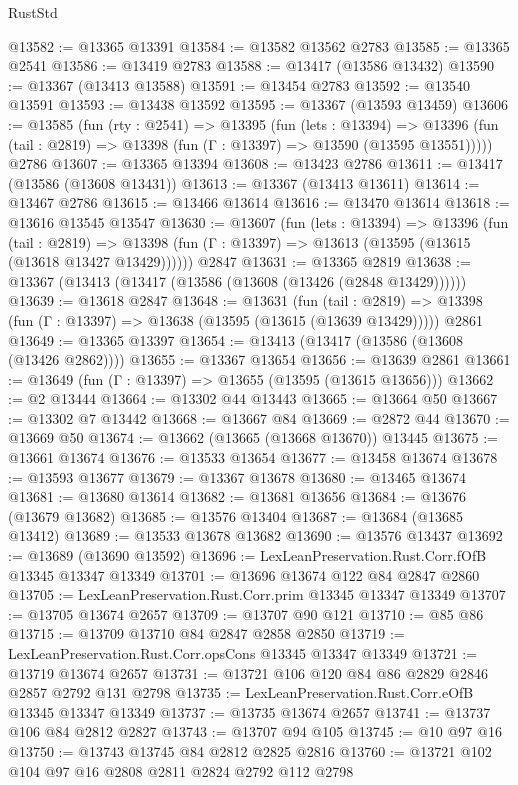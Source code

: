 \begin{lexlean}{RustStd}
\begin{coremodule}
@13582 := @13365 @13391
@13584 := @13582 @13562 @2783
@13585 := @13365 @2541
@13586 := @13419 @2783
@13588 := @13417 (@13586 @13432)
@13590 := @13367 (@13413 @13588)
@13591 := @13454 @2783
@13592 := @13540 @13591
@13593 := @13438 @13592
@13595 := @13367 (@13593 @13459)
@13606 := @13585
    (fun (rty : @2541) =>
    @13395
      (fun (lets : @13394) =>
      @13396 (fun (tail : @2819) => @13398 (fun (Γ : @13397) => @13590 (@13595 @13551)))))
    @2786
@13607 := @13365 @13394
@13608 := @13423 @2786
@13611 := @13417 (@13586 (@13608 @13431))
@13613 := @13367 (@13413 @13611)
@13614 := @13467 @2786
@13615 := @13466 @13614
@13616 := @13470 @13614
@13618 := @13616 @13545 @13547
@13630 := @13607
    (fun (lets : @13394) =>
    @13396
      (fun (tail : @2819) =>
      @13398 (fun (Γ : @13397) => @13613 (@13595 (@13615 (@13618 @13427 @13429))))))
    @2847
@13631 := @13365 @2819
@13638 := @13367 (@13413 (@13417 (@13586 (@13608 (@13426 (@2848 @13429))))))
@13639 := @13618 @2847
@13648 := @13631
    (fun (tail : @2819) => @13398 (fun (Γ : @13397) => @13638 (@13595 (@13615 (@13639 @13429)))))
    @2861
@13649 := @13365 @13397
@13654 := @13413 (@13417 (@13586 (@13608 (@13426 @2862))))
@13655 := @13367 @13654
@13656 := @13639 @2861
@13661 := @13649 (fun (Γ : @13397) => @13655 (@13595 (@13615 @13656)))
@13662 := @2 @13444
@13664 := @13302 @44 @13443
@13665 := @13664 @50
@13667 := @13302 @7 @13442
@13668 := @13667 @84
@13669 := @2872 @44
@13670 := @13669 @50
@13674 := @13662 (@13665 (@13668 @13670)) @13445
@13675 := @13661 @13674
@13676 := @13533 @13654
@13677 := @13458 @13674
@13678 := @13593 @13677
@13679 := @13367 @13678
@13680 := @13465 @13674
@13681 := @13680 @13614
@13682 := @13681 @13656
@13684 := @13676 (@13679 @13682)
@13685 := @13576 @13404
@13687 := @13684 (@13685 @13412)
@13689 := @13533 @13678 @13682
@13690 := @13576 @13437
@13692 := @13689 (@13690 @13592)
@13696 := LexLeanPreservation.Rust.Corr.fOfB @13345 @13347 @13349
@13701 := @13696 @13674 @122 @84 @2847 @2860
@13705 := LexLeanPreservation.Rust.Corr.prim @13345 @13347 @13349
@13707 := @13705 @13674 @2657
@13709 := @13707 @90 @121
@13710 := @85 @86
@13715 := @13709 @13710 @84 @2847 @2858 @2850
@13719 := LexLeanPreservation.Rust.Corr.opsCons @13345 @13347 @13349
@13721 := @13719 @13674 @2657
@13731 := @13721 @106 @120 @84 @86 @2829 @2846 @2857 @2792 @131 @2798
@13735 := LexLeanPreservation.Rust.Corr.eOfB @13345 @13347 @13349
@13737 := @13735 @13674 @2657
@13741 := @13737 @106 @84 @2812 @2827
@13743 := @13707 @94 @105
@13745 := @10 @97 @16
@13750 := @13743 @13745 @84 @2812 @2825 @2816
@13760 := @13721 @102 @104 @97 @16 @2808 @2811 @2824 @2792 @112 @2798

\end{coremodule}
\end{lexlean}
